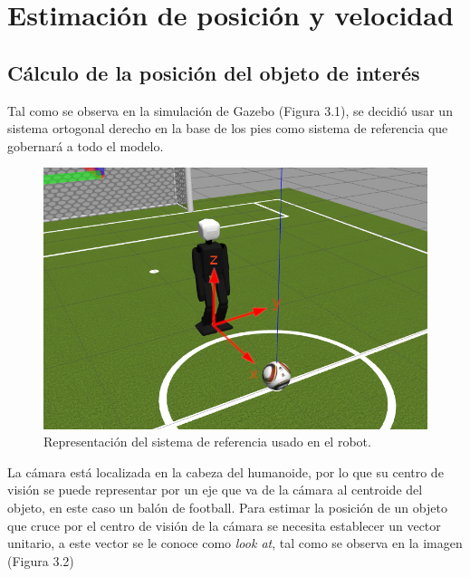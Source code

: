 \documentclass{book}
\begin{document}
\chapter{Estimación de posición y velocidad}
	\section{Cálculo de la posición del objeto de interés}
Tal como se observa en la simulación de Gazebo (Figura 3.1), se decidió usar un sistema ortogonal derecho en la base de los pies como sistema de referencia que gobernará a todo el modelo.

\begin{figure}
	\centering		
	\includegraphics[scale=2]{images/robot_ejes.png}
	\caption{Representación del sistema de referencia usado en el robot.}		
\end{figure}

La cámara está localizada en la cabeza del humanoide, por lo que su centro
de visión se puede representar por un eje que va de la cámara al centroide del 
objeto, en este caso un balón de football.
Para estimar la posición de un objeto que cruce por el centro de visión de la
cámara se necesita establecer un vector unitario, a este vector se le conoce
como \textit{look at}, tal como se observa en la imagen (Figura 3.2)
\end{document}
